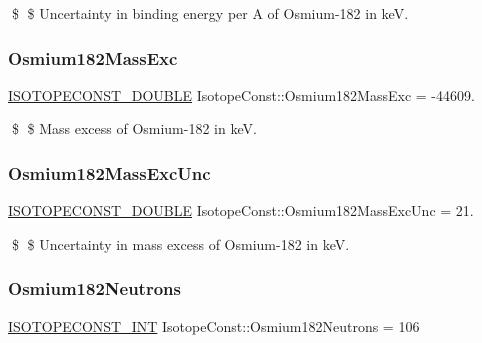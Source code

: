 \$ \$ Uncertainty in binding energy per A of Osmium-\/182 in keV. \mbox{\label{group___isotope_const-_osmium-_os182_ga1f87150d501e1ffe71c71a24668710f0}} 
\subsubsection{\texorpdfstring{Osmium182\+Mass\+Exc}{Osmium182MassExc}}
{\footnotesize\ttfamily \mbox{\hyperlink{group___isotope_const-_macros_ga8f45a7272ce02c0b4c65c44636ed719a}{I\+S\+O\+T\+O\+P\+E\+C\+O\+N\+S\+T\+\_\+\+D\+O\+U\+B\+LE}} Isotope\+Const\+::\+Osmium182\+Mass\+Exc = -\/44609.}

\$ \$ Mass excess of Osmium-\/182 in keV. \mbox{\label{group___isotope_const-_osmium-_os182_gadd7052991671f339adc6736b855aba05}} 
\subsubsection{\texorpdfstring{Osmium182\+Mass\+Exc\+Unc}{Osmium182MassExcUnc}}
{\footnotesize\ttfamily \mbox{\hyperlink{group___isotope_const-_macros_ga8f45a7272ce02c0b4c65c44636ed719a}{I\+S\+O\+T\+O\+P\+E\+C\+O\+N\+S\+T\+\_\+\+D\+O\+U\+B\+LE}} Isotope\+Const\+::\+Osmium182\+Mass\+Exc\+Unc = 21.}

\$ \$ Uncertainty in mass excess of Osmium-\/182 in keV. \mbox{\label{group___isotope_const-_osmium-_os182_ga84ed8020e77f187cc14c9acd80e9a842}} 
\subsubsection{\texorpdfstring{Osmium182\+Neutrons}{Osmium182Neutrons}}
{\footnotesize\ttfamily \mbox{\hyperlink{group___isotope_const-_macros_ga5f18360b3e99483a35c32d789e62621c}{I\+S\+O\+T\+O\+P\+E\+C\+O\+N\+S\+T\+\_\+\+I\+NT}} Isotope\+Const\+::\+Osmium182\+Neutrons = 106}

